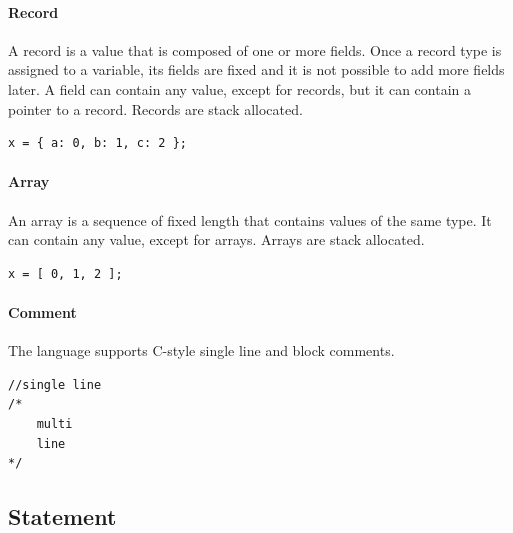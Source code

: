 \documentclass[thesis=M,english]{FITthesis}[2019/12/23]
\begin{document}
\paragraph*{Record} A record is a value that is composed of one or more fields. Once a record type is assigned to a variable, its fields are fixed and it is not possible to add more fields later. A field can contain any value, except for records, but it can contain a pointer to a record. Records are stack allocated.
\begin{verbatim}
x = { a: 0, b: 1, c: 2 };
\end{verbatim}

\paragraph*{Array} An array is a sequence of fixed length that contains values of the same type. It can contain any value, except for arrays. Arrays are stack allocated.
\begin{verbatim}
x = [ 0, 1, 2 ];
\end{verbatim}

\paragraph*{Comment} The language supports C-style single line and block comments.
\begin{verbatim}
//single line
/*
    multi
    line
*/
\end{verbatim}

\subsection{Statement}
\end{document}
